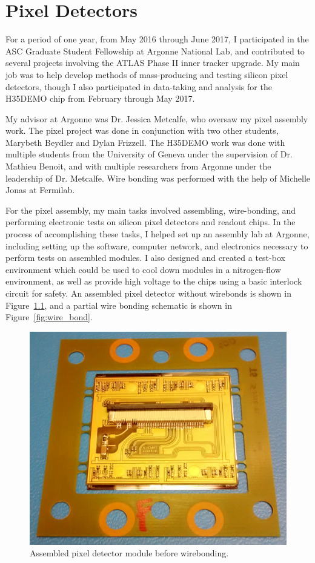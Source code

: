 \chapter{Pixel Detectors}

For a period of one year, from May 2016 through June 2017, I participated in the ASC Graduate Student Fellowship at Argonne National Lab, and contributed to several projects involving the ATLAS Phase II inner tracker upgrade. My main job was to help develop methods of mass-producing and testing silicon pixel detectors, though I also participated in data-taking and analysis for the H35DEMO chip from February through May 2017.

My advisor at Argonne was Dr. Jessica Metcalfe, who oversaw my pixel assembly work. The pixel project was done in conjunction with two other students, Marybeth Beydler and Dylan Frizzell. The H35DEMO work was done with multiple students from the University of Geneva under the supervision of Dr. Mathieu Benoit, and with multiple researchers from Argonne under the leadership of Dr. Metcalfe. Wire bonding was performed with the help of Michelle Jonas at Fermilab.

For the pixel assembly, my main tasks involved assembling, wire-bonding, and performing electronic tests on silicon pixel detectors and readout chips. In the process of accomplishing these tasks, I helped set up an assembly lab at Argonne, including setting up the software, computer network, and electronics necessary to perform tests on assembled modules. I also designed and created a test-box environment which could be used to cool down modules in a nitrogen-flow environment, as well as provide high voltage to the chips using a basic interlock circuit for safety. An assembled pixel detector without wirebonds is shown in Figure~\ref{fig:pixel_module}, and a partial wire bonding schematic is shown in Figure~\ref{fig:wire_bond}.

\begin{figure}[htbp]
    \centering
    \includegraphics[width=0.7\linewidth]{Images/Other/pixel_detector.jpg}
    \caption{Assembled pixel detector module before wirebonding.}
    \label{fig:pixel_module}
\end{figure}

